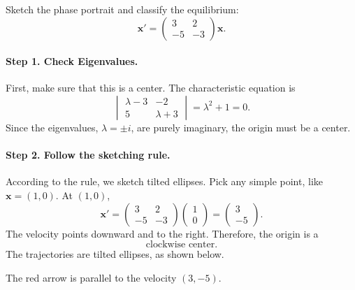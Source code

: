 \documentclass[11pt,letterpaper]{article}
\begin{document}
\begin{example}[5]{
Sketch the phase portrait and classify the equilibrium:
\[
\mathbf{x}'=
\begin{pmatrix}
3&2\\
-5&-3
\end{pmatrix}\mathbf{x}.
\]
}

\paragraph{Step 1. Check Eigenvalues.}
First, make sure that this is a center. The characteristic equation is
\[
\begin{vmatrix}
\lambda-3&-2\\
5&\lambda+3
\end{vmatrix}
=\lambda^2+1=0.
\]
Since the eigenvalues, $\lambda=\pm i$, are purely imaginary, the origin must be a center.

\paragraph{Step 2. Follow the sketching rule.} According to the rule, we sketch tilted ellipses. Pick any simple point, like $\textbf{x}=(1,0)$. At $(1,0)$,
\[
\mathbf{x}'=
\begin{pmatrix}
3&2\\
-5&-3
\end{pmatrix}
\begin{pmatrix}1\\0\end{pmatrix}
=
\begin{pmatrix}3\\-5\end{pmatrix}.
\]
The velocity points downward and to the right.
Therefore, the origin is a
\[
\boxed{\text{clockwise center}.}
\]
The trajectories are tilted ellipses, as shown below. 

\begin{center}
\end{center}
The red arrow is parallel to the velocity $(3,-5)$.
\end{example}
\end{document}
